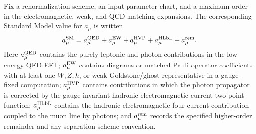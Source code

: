 \begin{definition}
\label{def:sm-muon-gminus-two-hybrid-decomposition}
Fix a renormalization scheme, an input-parameter chart, and a maximum order in
the electromagnetic, weak, and QCD matching expansions.  The corresponding
Standard Model value for \(a_\mu\) is written
\begin{equation}
  a_\mu^{\rm SM}
  =
  a_\mu^{\rm QED}
  +a_\mu^{\rm EW}
  +a_\mu^{\rm HVP}
  +a_\mu^{\rm HLbL}
  +a_\mu^{\rm rem}.
  \label{eq:sm-muon-gminus-two-hybrid-decomposition}
\end{equation}
Here \(a_\mu^{\rm QED}\) contains the purely leptonic and photon
contributions in the low-energy QED EFT; \(a_\mu^{\rm EW}\) contains diagrams
or matched Pauli-operator coefficients with at least one \(W,Z,h\), or weak
Goldstone/ghost representative in a gauge-fixed computation;
\(a_\mu^{\rm HVP}\) contains contributions in which the photon propagator is
corrected by the gauge-invariant hadronic electromagnetic current two-point
function; \(a_\mu^{\rm HLbL}\) contains the hadronic electromagnetic
four-current contribution coupled to the muon line by photons; and
\(a_\mu^{\rm rem}\) records the specified higher-order remainder and any
separation-scheme convention.
\end{definition}

